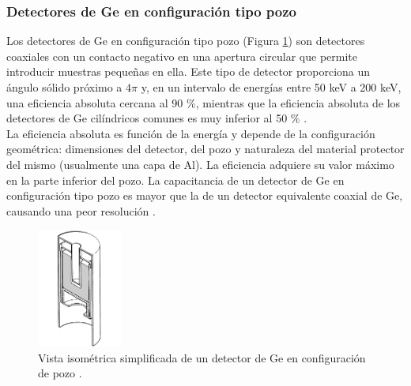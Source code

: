 			\subsubsection{Detectores de Ge en configuración tipo pozo}\label{Sec-GePozo}
Los detectores de Ge en configuración tipo pozo (Figura \ref{Fig-WellDetectorORTEC}) son detectores coaxiales con un contacto negativo en una apertura circular que permite introducir muestras pequeñas en ella. Este tipo de detector proporciona un ángulo sólido próximo a $4\pi$ y, en un intervalo de energías entre 50 keV a 200 keV, una eficiencia absoluta cercana al 90 \%, mientras que la eficiencia absoluta de los detectores de Ge cilíndricos comunes es muy inferior al 50 \% \cite{gilmore2008}.
\vspace{0.5cm}\\
La eficiencia absoluta es función de la energía y depende de la configuración geométrica: dimensiones del detector, del pozo y naturaleza del material protector del mismo (usualmente una capa de Al). La eficiencia adquiere su valor máximo en la parte inferior del pozo. La  capacitancia  de un detector de Ge en configuración tipo  pozo  es  mayor que la de un detector equivalente coaxial de Ge, causando una peor resolución  \cite{gilmore2008}.
\begin{figure}[h]
\centering
\includegraphics[width=0.25\textwidth]{Imagenes/WellDetectorSimply.png}
\caption{Vista isométrica simplificada de un detector de Ge en configuración de pozo \cite{WellDetectorORTEC}.}\label{Fig-WellDetectorORTEC}
\end{figure}

